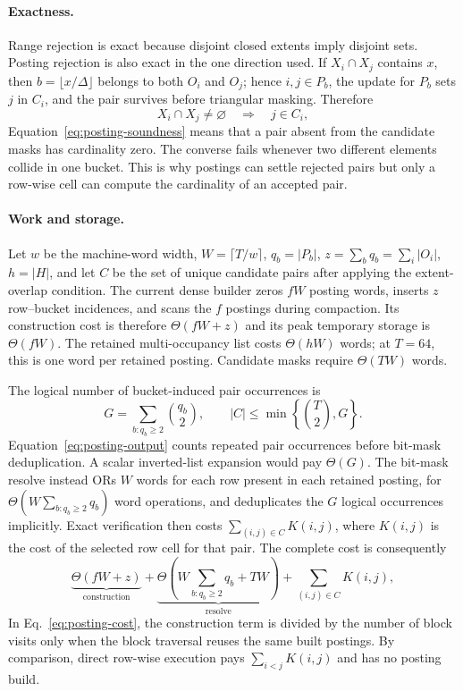 \paragraph*{Exactness.}
Range rejection is exact because disjoint closed extents imply disjoint sets. Posting rejection is
also exact in the one direction used. If $X_i\cap X_j$ contains $x$, then
$b=\lfloor x/\Delta\rfloor$ belongs to both $O_i$ and $O_j$; hence $i,j\in P_b$, the update for $P_b$
sets $j$ in $C_i$, and the pair survives before triangular masking. Therefore
\begin{equation}
X_i\cap X_j\ne\varnothing\quad\Longrightarrow\quad
j\in C_i,
\label{eq:posting-soundness}
\end{equation}
Equation~\eqref{eq:posting-soundness} means that a pair absent from the candidate masks has
cardinality zero. The converse fails whenever two
different elements collide in one bucket. This is why postings can settle rejected pairs but only a
row-wise cell can compute the cardinality of an accepted pair.

\paragraph*{Work and storage.}
Let $w$ be the machine-word width, $W=\lceil T/w\rceil$, $q_b=|P_b|$,
$z=\sum_b q_b=\sum_i|O_i|$, $h=|H|$, and let $C$ be the set of unique candidate pairs
after applying the extent-overlap condition. The current dense builder zeros $fW$ posting words,
inserts $z$ row--bucket
incidences, and scans the $f$ postings during compaction. Its construction cost is therefore
$\Theta(fW+z)$ and its peak temporary storage is $\Theta(fW)$. The retained multi-occupancy list costs
$\Theta(hW)$ words; at $T=64$, this is one word per retained posting. Candidate masks require
$\Theta(TW)$ words.

The logical number of bucket-induced pair occurrences is
\begin{equation}
G=\sum_{b:q_b\ge2}\binom{q_b}{2},
\qquad |C|\le \min\!\left\{\binom{T}{2},G\right\}.
\label{eq:posting-output}
\end{equation}
Equation~\eqref{eq:posting-output} counts repeated pair occurrences before bit-mask deduplication.
A scalar inverted-list expansion would pay $\Theta(G)$. The bit-mask resolve instead ORs $W$ words
for each row present in each retained posting, for
$\Theta\!\left(W\sum_{b:q_b\ge2}q_b\right)$ word operations, and deduplicates the $G$ logical
occurrences implicitly. Exact verification then costs
$\sum_{(i,j)\in C}K(i,j)$, where $K(i,j)$ is the cost of the selected row cell for that pair. The
complete cost is consequently
\begin{equation}
\underbrace{\Theta(fW+z)}_{\text{construction}}+
\underbrace{\Theta\!\left(W\sum_{b:q_b\ge2}q_b+TW\right)}_{\text{resolve}}+
\sum_{(i,j)\in C}K(i,j),
\label{eq:posting-cost}
\end{equation}
In Eq.~\eqref{eq:posting-cost}, the construction term is divided by the number of block visits only
when the block traversal reuses
the same built postings. By comparison, direct row-wise execution pays
$\sum_{i<j}K(i,j)$ and has no posting build.

